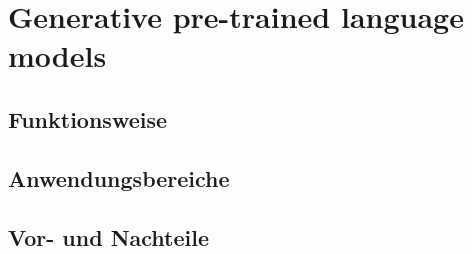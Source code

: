 \section{Generative pre-trained language models}

\subsection{Funktionsweise}

\subsection{Anwendungsbereiche}

\subsection{Vor- und Nachteile}
